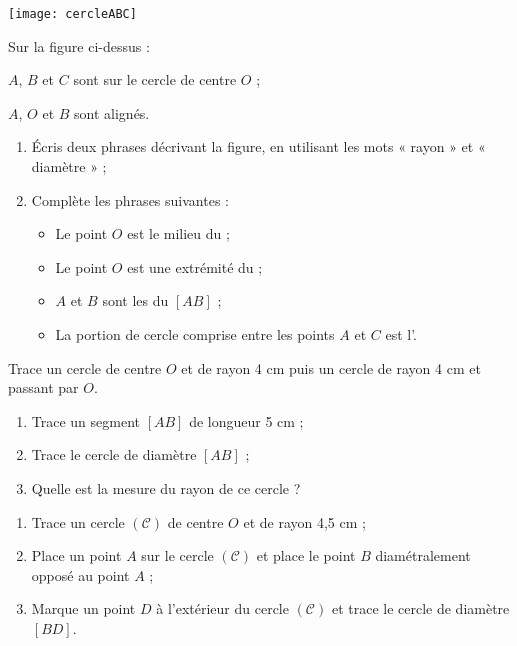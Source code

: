 \begin{exercice}[Vocabulaire]
 \begin{center} \texttt{[image: cercleABC]} \end{center}
 Sur la figure ci-dessus : 
 
$A$, $B$ et $C$ sont sur le cercle de centre $O$ ;

$A$, $O$ et $B$ sont alignés.
 \begin{enumerate}
  \item Écris deux phrases décrivant la figure, en utilisant les mots « rayon » et « diamètre » ;
  \item Complète les phrases suivantes :
   \begin{itemize}
    \item Le point $O$ est le milieu du \dotfill ;
    \item Le point $O$ est une extrémité du \dotfill ;
    \item $A$ et $B$ sont les \dotfill du \dotfill $[AB]$ ;
    \item La portion de cercle comprise entre les points $A$ et $C$ est l'\dotfill.
    \end{itemize}
  \end{enumerate}
\end{exercice}


\begin{exercice}
Trace un cercle de centre $O$ et de rayon 4 cm puis un cercle de rayon 4 cm et passant par $O$.
\end{exercice}


\begin{exercice}
 \begin{enumerate}
  \item Trace un segment $[AB]$ de longueur 5 cm ;
  \item Trace le cercle de diamètre $[AB]$ ;
  \item Quelle est la mesure du rayon de ce cercle ?
  \end{enumerate}
\end{exercice}



\begin{exercice}[Construction]
 \begin{enumerate}
  \item Trace un cercle $(\mathcal{C})$ de centre $O$ et de rayon 4,5 cm ;
  \item Place un point $A$ sur le cercle $(\mathcal{C})$ et place le point $B$ diamétralement opposé au point $A$ ;
  \item Marque un point $D$ à l'extérieur du cercle $(\mathcal{C})$ et trace le cercle de diamètre $[BD]$.
 \end{enumerate}
\end{exercice}



